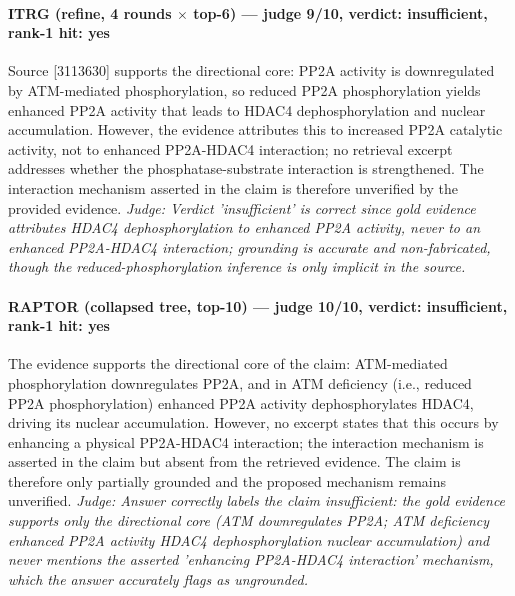 \documentclass[sigconf, review, anonymous]{acmart}
\begin{document}
\paragraph{ITRG (refine, 4 rounds $\times$ top-6) --- judge 9/10, verdict: insufficient, rank-1 hit: yes}
\noindent Source [3113630] supports the directional core: PP2A activity is downregulated by ATM-mediated phosphorylation, so reduced PP2A phosphorylation yields enhanced PP2A activity that leads to HDAC4 dephosphorylation and nuclear accumulation. However, the evidence attributes this to increased PP2A catalytic activity, not to enhanced PP2A-HDAC4 interaction; no retrieval excerpt addresses whether the phosphatase-substrate interaction is strengthened. The interaction mechanism asserted in the claim is therefore unverified by the provided evidence.
\noindent\small\textit{Judge: Verdict 'insufficient' is correct since gold evidence attributes HDAC4 dephosphorylation to enhanced PP2A activity, never to an enhanced PP2A-HDAC4 interaction; grounding is accurate and non-fabricated, though the reduced-phosphorylation inference is only implicit in the source.}
\paragraph{RAPTOR (collapsed tree, top-10) --- judge 10/10, verdict: insufficient, rank-1 hit: yes}
\noindent The evidence supports the directional core of the claim: ATM-mediated phosphorylation downregulates PP2A, and in ATM deficiency (i.e., reduced PP2A phosphorylation) enhanced PP2A activity dephosphorylates HDAC4, driving its nuclear accumulation. However, no excerpt states that this occurs by enhancing a physical PP2A-HDAC4 interaction; the interaction mechanism is asserted in the claim but absent from the retrieved evidence. The claim is therefore only partially grounded and the proposed mechanism remains unverified.
\noindent\small\textit{Judge: Answer correctly labels the claim insufficient: the gold evidence supports only the directional core (ATM downregulates PP2A; ATM deficiency  enhanced PP2A activity  HDAC4 dephosphorylation  nuclear accumulation) and never mentions the asserted 'enhancing PP2A-HDAC4 interaction' mechanism, which the answer accurately flags as ungrounded.}
\end{document}
